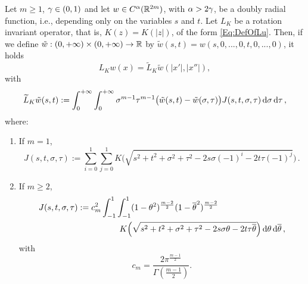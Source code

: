 \begin{lemma}
\label{Lemma:OperatorInSTVariables} Let $m \geq 1$, $\gamma\in(0,1)$ and let $w\in
C^\alpha(\mathbb{R}^{2m})$, with $\alpha > 2\gamma$, be a doubly radial function, i.e., depending only on the variables $s$ and $t$. Let $L_K$ be a rotation invariant operator, that is, $K(z) = K(|z|)$, of the form \eqref{Eq:DefOfLu}. Then, if we define $\tilde{w}:(0,+\infty)\times (0,+\infty) \to \mathbb{R}$ by $\tilde{w}(s,t) = w(s,0,...,0,t,0,...,0)$, it holds
$$ L_Kw(x) = \tilde{L}_K \tilde{w} (|x'|,|x''|), $$
with
\begin{equation*}
\label{Eq:OperatorInSTVariables}
\widetilde{L}_K \tilde{w} (s,t) := \int_0^{+\infty}  \int_0^{+\infty} \sigma^{m-1} \tau^{m-1} \big(\tilde{w}(s,t) - \tilde{w}(\sigma, \tau)\big) J(s,t,\sigma, \tau)  \,\mathrm{d} \sigma\,\mathrm{d} \tau\,,
\end{equation*}
where:
\begin{enumerate}
	\item If $m= 1$,
	\begin{equation}
		\label{Eq:KernelInSTVariablesR2}
	J(s,t,\sigma, \tau) := \sum_{i=0}^1  \sum_{j =0}^1  K\Big(\sqrt{s^2 + t^2 + \sigma^2 + \tau^2 -2 s \sigma (-1)^i -2 t \tau (-1)^j}\Big)\,.
	\end{equation}
	
	\item If $m\geq 2$,
	\begin{align}
	J(s,t,\sigma, \tau) &:= c_m ^2  \int_{-1}^1  \int_{-1}^1  (1-\theta^2)^{\frac{m-2}{2}} (1-\overline{\theta}^2)^{\frac{m-2}{2}} \nonumber\\
	& \quad \quad \quad \quad \quad
	K\Big(\sqrt{s^2 + t^2 + \sigma^2 + \tau^2 -2 s \sigma \theta -2 t \tau \overline{\theta}}\Big) \,\mathrm{d} \theta \,\mathrm{d} \overline{\theta}\,, \label{Eq:KernelSTVariables2}
	\end{align}
	with
	$$
	c_m = \dfrac{2 \pi^{\frac{m-1}{2}}}{\Gamma (\frac{m-1}{2})}.
	$$
\end{enumerate}
\end{lemma}


